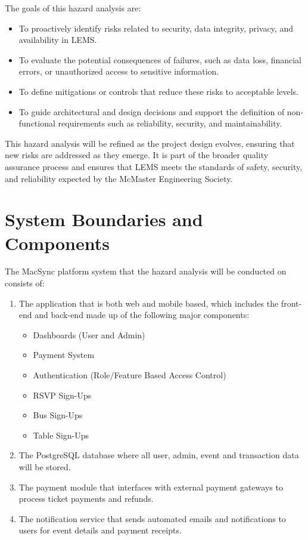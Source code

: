 \documentclass{article}
\begin{document}
\par
\vspace{1em}

The goals of this hazard analysis are:
\begin{itemize}
  \item To proactively identify risks related to security, data integrity, privacy, and availability in LEMS.
  \item To evaluate the potential consequences of failures, such as data loss, financial errors, or 
        unauthorized access to sensitive information.
  \item To define mitigations or controls that reduce these risks to acceptable levels.
  \item To guide architectural and design decisions and support the definition of non-functional 
        requirements such as reliability, security, and maintainability.
\end{itemize}

This hazard analysis will be refined as the project design evolves, ensuring that new risks are 
addressed as they emerge. It is part of the broader quality assurance process and ensures that LEMS 
meets the standards of safety, security, and reliability expected by the McMaster Engineering Society.

\section{System Boundaries and Components}

The MacSync platform system that the hazard analysis will be conducted on consists of:
\begin{enumerate}
    \item The application that is both web and mobile based, which includes the front-end and back-end made up of the following major components:
    \begin{itemize}
        \item Dashboards (User and Admin)
        \item Payment System
        \item Authentication (Role/Feature Based Access Control)
        \item RSVP Sign-Ups
        \item Bus Sign-Ups
        \item Table Sign-Ups
    \end{itemize}
    \item The PostgreSQL database where all user, admin, event and transaction data will be stored.
    \item The payment module that interfaces with external payment gateways to process ticket payments and refunds.
    \item The notification service that sends automated emails and notifications to users for event details and payment receipts.
\end{enumerate}
\end{document}
